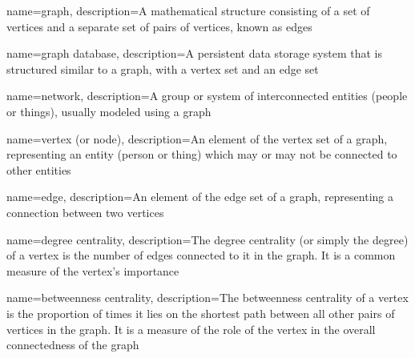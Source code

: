 \usepackage{booktabs}
\usepackage{longtable}
\usepackage{graphicx}
\usepackage[bf,singlelinecheck=off]{caption}
\usepackage[scale=.8]{sourcecodepro}


\usepackage{framed,color}

\renewcommand{\textfraction}{0.05}
\renewcommand{\topfraction}{0.8}
\renewcommand{\bottomfraction}{0.8}
\renewcommand{\floatpagefraction}{0.75}

\renewenvironment{quote}{\begin{VF}}{\end{VF}}
\let\oldhref\href
\renewcommand{\href}[2]{#2\footnote{\url{#1}}}

\makeatletter


\usepackage{makeidx}
\makeindex


\usepackage{amsthm}
\makeatletter
\def\thm@space@setup{%
  \thm@preskip=8pt plus 2pt minus 4pt
  \thm@postskip=\thm@preskip
}
\makeatother

\usepackage[nonumberlist]{glossaries}
\makenoidxglossaries

{
    name={graph},
    description={A mathematical structure consisting of a set of vertices and a separate set of pairs of vertices, known as edges}
}

{
    name={graph database},
    description={A persistent data storage system that is structured similar to a graph, with a vertex set and an edge set}
}

{
    name={network},
    description={A group or system of interconnected entities (people or things), usually modeled using a graph}
}


{
    name={vertex (or node)},
    description={An element of the vertex set of a graph, representing an entity (person or thing) which may or may not be connected to other entities}
}

{
    name={edge},
    description={An element of the edge set of a graph, representing a connection between two vertices}
}

{
    name={degree centrality},
    description={The degree centrality (or simply the degree) of a vertex is the number of edges connected to it in the graph. It is a common measure of the vertex's importance}
}

{
    name={betweenness centrality},
    description={The betweenness centrality of a vertex is the proportion of times it lies on the shortest path between all other pairs of vertices in the graph. It is a measure of the role of the vertex in the overall connectedness of the graph}
}

